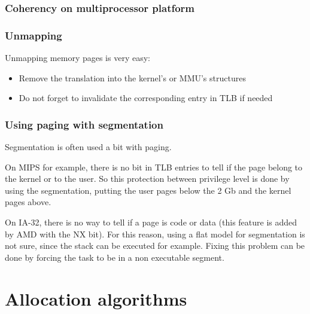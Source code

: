 
\begin{frame}
  \frametitle{Coherency on multiprocessor platform}

  \begin{center}
  \end{center}

\end{frame}


\begin{frame}
  \frametitle{Unmapping}

  Unmapping memory pages is very easy:

  \begin{itemize}
  \item
    Remove the translation into the kernel's or MMU's structures
  \item
    Do not forget to invalidate the corresponding entry in TLB if
    needed
  \end{itemize}

\end{frame}


\begin{frame}
  \frametitle{Using paging with segmentation}

  Segmentation is often used a bit with paging.

  \-

  On MIPS for example, there is no bit in TLB entries to tell if the
  page belong to the kernel or to the user. So this protection between
  privilege level is done by using the segmentation, putting the user
  pages below the 2 Gb and the kernel pages above.

  \-

  On IA-32, there is no way to tell if a page is code or data (this
  feature is added by AMD with the NX bit). For this reason, using a
  flat model for segmentation is not sure, since the stack can be
  executed for example. Fixing this problem can be done by forcing the
  task to be in a non executable segment.

\end{frame}

%
%

\section{Allocation algorithms}

